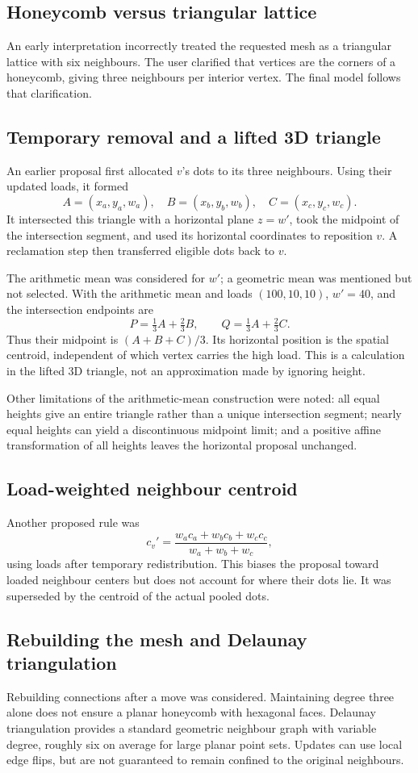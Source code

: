 \documentclass[11pt]{article}
\begin{document}
\subsection{Honeycomb versus triangular lattice}
An early interpretation incorrectly treated the requested mesh as a triangular lattice with six neighbours. The user clarified that vertices are the corners of a honeycomb, giving three neighbours per interior vertex. The final model follows that clarification.

\subsection{Temporary removal and a lifted 3D triangle}
An earlier proposal first allocated $v$'s dots to its three neighbours. Using their updated loads, it formed
\[
A=(x_a,y_a,w_a),\quad B=(x_b,y_b,w_b),\quad C=(x_c,y_c,w_c).
\]
It intersected this triangle with a horizontal plane $z=w'$, took the midpoint of the intersection segment, and used its horizontal coordinates to reposition $v$. A reclamation step then transferred eligible dots back to $v$.

The arithmetic mean was considered for $w'$; a geometric mean was mentioned but not selected. With the arithmetic mean and loads $(100,10,10)$, $w'=40$, and the intersection endpoints are
\[
P=\tfrac13 A+\tfrac23 B,\qquad Q=\tfrac13 A+\tfrac23 C.
\]
Thus their midpoint is $(A+B+C)/3$. Its horizontal position is the spatial centroid, independent of which vertex carries the high load. This is a calculation in the lifted 3D triangle, not an approximation made by ignoring height.

Other limitations of the arithmetic-mean construction were noted: all equal heights give an entire triangle rather than a unique intersection segment; nearly equal heights can yield a discontinuous midpoint limit; and a positive affine transformation of all heights leaves the horizontal proposal unchanged.

\subsection{Load-weighted neighbour centroid}
Another proposed rule was
\[
c_v'=\frac{w_a c_a+w_b c_b+w_c c_c}{w_a+w_b+w_c},
\]
using loads after temporary redistribution. This biases the proposal toward loaded neighbour centers but does not account for where their dots lie. It was superseded by the centroid of the actual pooled dots.

\subsection{Rebuilding the mesh and Delaunay triangulation}
Rebuilding connections after a move was considered. Maintaining degree three alone does not ensure a planar honeycomb with hexagonal faces. Delaunay triangulation provides a standard geometric neighbour graph with variable degree, roughly six on average for large planar point sets. Updates can use local edge flips, but are not guaranteed to remain confined to the original neighbours.
\end{document}

